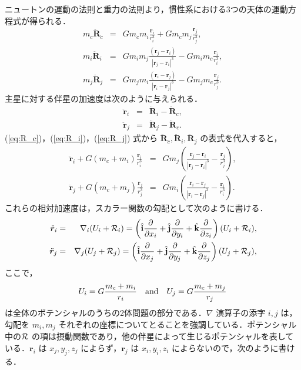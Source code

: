 \documentclass[11pt,a4paper,oneside,onecolumn]{jarticle}
\begin{document}
ニュートンの運動の法則と重力の法則より，慣性系における3つの天体の運動方程式が得られる．
\begin{eqnarray}
m_c \ddot{\bm R}_c & = & G m_c m_i \frac{{\bm r}_i}{r_i^3} + G m_c m_j \frac{{\bm r}_j}{r_j^3}, \label{eq:R_c}\\
m_i \ddot{\bm R}_i & = & G m_i m_j \frac{({\bm r}_j - {\bm r}_i)}{|{\bm r}_j - {\bm r}_i|^3} - G m_i m_c \frac{{\bm r}_i}{r_i^3}, \label{eq:R_i}\\
m_j \ddot{\bm R}_j & = & G m_j m_i \frac{({\bm r}_i - {\bm r}_j)}{|{\bm r}_i - {\bm r}_j|^3} - G m_j m_c \frac{{\bm r}_j}{r_j^3}. \label{eq:R_j}
\end{eqnarray}
主星に対する伴星の加速度は次のように与えられる．
\begin{eqnarray}
\ddot{\bm r}_i & = & \ddot{\bm R}_i - \ddot{\bm R}_c, \\
\ddot{\bm r}_j & = & \ddot{\bm R}_j - \ddot{\bm R}_c.
\end{eqnarray}
(\ref{eq:R_c})，(\ref{eq:R_i})，(\ref{eq:R_j}) 式から $\ddot{\bm R}_c, \ddot{\bm R}_i, \ddot{\bm R}_j$ の表式を代入すると，
\begin{eqnarray}
\ddot{\bm r}_i + G (m_c + m_i) \frac{{\bm r}_i}{r_i^3} & = & G m_j \left( \frac{{\bm r}_j - {\bm r}_i}{| {\bm r}_j - {\bm r}_i |^3} - \frac{{\bm r}_j}{r_j^3} \right), \label{eq:r_i} \\ 
\ddot{\bm r}_j + G (m_c + m_j) \frac{{\bm r}_j}{r_j^3} & = & G m_i \left( \frac{{\bm r}_i - {\bm r}_j}{| {\bm r}_i - {\bm r}_j |^3} - \frac{{\bm r}_i}{r_i^3} \right). \label{eq:r_j}
\end{eqnarray}
これらの相対加速度は，スカラー関数の勾配として次のように書ける．
\begin{eqnarray}
\ddot{\bm r}_i & = & \nabla_i (U_i + {\cal R}_i) = \left( \hat{\bf i} \frac{\partial}{\partial x_i} + \hat{{\bf j}} \frac{\partial}{\partial y_i} + \hat{\bf k} \frac{\partial}{\partial z_i} \right) (U_i + {\cal R}_i), \label{eq:r_i_nabla} \\ 
\ddot{\bm r}_j & = & \nabla_j (U_j + {\cal R}_j) = \left( \hat{\bf i} \frac{\partial}{\partial x_j} + \hat{{\bf j}} \frac{\partial}{\partial y_j} + \hat{\bf k} \frac{\partial}{\partial z_j} \right) (U_j + {\cal R}_j), \label{eq:r_j_nabla}
\end{eqnarray}
ここで，
\begin{equation}
U_i = G \frac{m_c + m_i}{r_i} \quad {\rm and} \quad U_j = G \frac{m_c + m_j}{r_j}
\end{equation}
は全体のポテンシャルのうちの2体問題の部分である．$\nabla$ 演算子の添字 $i, j$ は，勾配を $m_i, m_j$ それぞれの座標についてとることを強調している．ポテンシャル中の${\cal R}$ の項は摂動関数であり，他の伴星によって生じるポテンシャルを表している．${\bm r}_i$ は $x_j, y_j, z_j$ によらず，${\bm r}_j$ は $x_i, y_i, z_i$ によらないので，次のように書ける．
\end{document}
